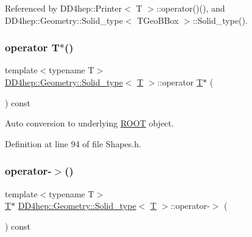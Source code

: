 Referenced by D\+D4hep\+::\+Printer$<$ T $>$\+::operator()(), and D\+D4hep\+::\+Geometry\+::\+Solid\+\_\+type$<$ T\+Geo\+B\+Box $>$\+::\+Solid\+\_\+type().

\hypertarget{class_d_d4hep_1_1_geometry_1_1_solid__type_a58acff0e20e5b149236c2eee1f5ec19d}{}\label{class_d_d4hep_1_1_geometry_1_1_solid__type_a58acff0e20e5b149236c2eee1f5ec19d} 
\subsubsection{\texorpdfstring{operator T$\ast$()}{operator T*()}}
{\footnotesize\ttfamily template$<$typename T$>$ \\
\hyperlink{class_d_d4hep_1_1_geometry_1_1_solid__type}{D\+D4hep\+::\+Geometry\+::\+Solid\+\_\+type}$<$ \hyperlink{class_t}{T} $>$\+::operator \hyperlink{class_t}{T}$\ast$ (\begin{DoxyParamCaption}{ }\end{DoxyParamCaption}) const\hspace{0.3cm}{\ttfamily [inline]}}



Auto conversion to underlying \hyperlink{namespace_r_o_o_t}{R\+O\+OT} object. 



Definition at line 94 of file Shapes.\+h.

\hypertarget{class_d_d4hep_1_1_geometry_1_1_solid__type_a9efc04a0a590c911de79def1b5e3b630}{}\label{class_d_d4hep_1_1_geometry_1_1_solid__type_a9efc04a0a590c911de79def1b5e3b630} 
\subsubsection{\texorpdfstring{operator-\/$>$()}{operator->()}}
{\footnotesize\ttfamily template$<$typename T$>$ \\
\hyperlink{class_t}{T}$\ast$ \hyperlink{class_d_d4hep_1_1_geometry_1_1_solid__type}{D\+D4hep\+::\+Geometry\+::\+Solid\+\_\+type}$<$ \hyperlink{class_t}{T} $>$\+::operator-\/$>$ (\begin{DoxyParamCaption}{ }\end{DoxyParamCaption}) const\hspace{0.3cm}{\ttfamily [inline]}}



